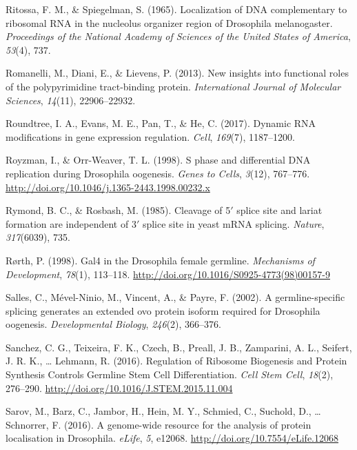 \documentclass[12pt,twoside]{reedthesis}
\newlength{\cslhangindent}
\newenvironment{cslreferences}%
  {\setlength{\parindent}{0pt}%
  \everypar{\setlength{\hangindent}{\cslhangindent}}\ignorespaces}%
  {\par}
\begin{document}
\begin{cslreferences}
\leavevmode\hypertarget{ref-Ritossa1965a}{}%
Ritossa, F. M., \& Spiegelman, S. (1965). Localization of DNA complementary to ribosomal RNA in the nucleolus organizer region of Drosophila melanogaster. \emph{Proceedings of the National Academy of Sciences of the United States of America}, \emph{53}(4), 737.

\leavevmode\hypertarget{ref-Romanelli2013}{}%
Romanelli, M., Diani, E., \& Lievens, P. (2013). New insights into functional roles of the polypyrimidine tract-binding protein. \emph{International Journal of Molecular Sciences}, \emph{14}(11), 22906--22932.

\leavevmode\hypertarget{ref-Roundtree2017}{}%
Roundtree, I. A., Evans, M. E., Pan, T., \& He, C. (2017). Dynamic RNA modifications in gene expression regulation. \emph{Cell}, \emph{169}(7), 1187--1200.

\leavevmode\hypertarget{ref-Royzman1998}{}%
Royzman, I., \& Orr-Weaver, T. L. (1998). S phase and differential DNA replication during Drosophila oogenesis. \emph{Genes to Cells}, \emph{3}(12), 767--776. \url{http://doi.org/10.1046/j.1365-2443.1998.00232.x}

\leavevmode\hypertarget{ref-Rymond1985}{}%
Rymond, B. C., \& Rosbash, M. (1985). Cleavage of 5\({'}\) splice site and lariat formation are independent of 3\({'}\) splice site in yeast mRNA splicing. \emph{Nature}, \emph{317}(6039), 735.

\leavevmode\hypertarget{ref-rorthGal4DrosophilaFemale1998}{}%
Rørth, P. (1998). Gal4 in the Drosophila female germline. \emph{Mechanisms of Development}, \emph{78}(1), 113--118. \url{http://doi.org/10.1016/S0925-4773(98)00157-9}

\leavevmode\hypertarget{ref-Salles2002}{}%
Salles, C., Mével-Ninio, M., Vincent, A., \& Payre, F. (2002). A germline-specific splicing generates an extended ovo protein isoform required for Drosophila oogenesis. \emph{Developmental Biology}, \emph{246}(2), 366--376.

\leavevmode\hypertarget{ref-Sanchez2016h}{}%
Sanchez, C. G., Teixeira, F. K., Czech, B., Preall, J. B., Zamparini, A. L., Seifert, J. R. K., \ldots{} Lehmann, R. (2016). Regulation of Ribosome Biogenesis and Protein Synthesis Controls Germline Stem Cell Differentiation. \emph{Cell Stem Cell}, \emph{18}(2), 276--290. \url{http://doi.org/10.1016/J.STEM.2015.11.004}

\leavevmode\hypertarget{ref-sarovGenomewideResourceAnalysis2016}{}%
Sarov, M., Barz, C., Jambor, H., Hein, M. Y., Schmied, C., Suchold, D., \ldots{} Schnorrer, F. (2016). A genome-wide resource for the analysis of protein localisation in Drosophila. \emph{eLife}, \emph{5}, e12068. \url{http://doi.org/10.7554/eLife.12068}


\end{cslreferences}
\end{document}
